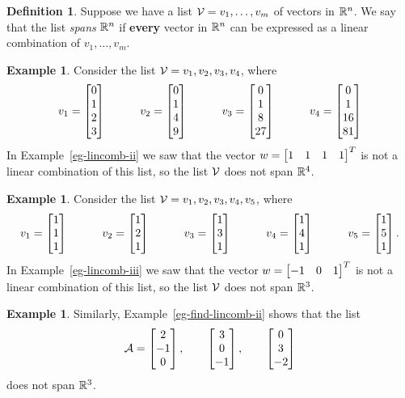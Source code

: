 \documentclass[reqno]{amsart}
\theoremstyle{definition}
\newtheorem{definition}[theorem]{Definition}
\newtheorem{example}[theorem]{Example}
\begin{document}
\begin{definition}\label{defn-spanning-list}
 Suppose we have a list $\mathcal{V}=v_1,\dotsc,v_m$ of vectors in ${\mathbb{R}}^n$.  We
 say that the list \emph{spans} ${\mathbb{R}}^n$ if \textbf{every} vector in
 ${\mathbb{R}}^n$ can be expressed as a linear combination of $v_1,\dotsc,v_m$.
\end{definition}
\begin{example}\label{eg-not-span-i}
 Consider the list $\mathcal{V}=v_1,v_2,v_3,v_4$, where
 \[ v_1 = \left[\begin{matrix} 0 \\ 1 \\  2 \\  3 \end{matrix}\right] \hspace{3em}
    v_2 = \left[\begin{matrix} 0 \\ 1 \\  4 \\  9 \end{matrix}\right] \hspace{3em}
    v_3 = \left[\begin{matrix} 0 \\ 1 \\  8 \\ 27 \end{matrix}\right] \hspace{3em}
    v_4 = \left[\begin{matrix} 0 \\ 1 \\ 16 \\ 81 \end{matrix}\right]
 \]
 In Example~\ref{eg-lincomb-ii} we saw that the vector
 $w=\left[\begin{matrix} 1 & 1 & 1 & 1\end{matrix}\right]^T$ is not a linear combination of this
 list, so the list $\mathcal{V}$ does not span ${\mathbb{R}}^4$.
\end{example}
\begin{example}\label{eg-not-span-ii}
 Consider the list $\mathcal{V}=v_1,v_2,v_3,v_4,v_5$, where
 \[ v_1 = \left[\begin{matrix} 1 \\ 1 \\ 1 \end{matrix}\right] \hspace{3em}
    v_2 = \left[\begin{matrix} 1 \\ 2 \\ 1 \end{matrix}\right] \hspace{3em}
    v_3 = \left[\begin{matrix} 1 \\ 3 \\ 1 \end{matrix}\right] \hspace{3em}
    v_4 = \left[\begin{matrix} 1 \\ 4 \\ 1 \end{matrix}\right] \hspace{3em}
    v_5 = \left[\begin{matrix} 1 \\ 5 \\ 1 \end{matrix}\right].
 \]
 In Example~\ref{eg-lincomb-iii} we saw that the vector
 $w=\left[\begin{matrix} -1 & 0 & 1 \end{matrix}\right]^T$ is not a linear combination of this
 list, so the list $\mathcal{V}$ does not span ${\mathbb{R}}^3$.
\end{example}
\begin{example}\label{eg-not-span-iii}
 Similarly, Example~\ref{eg-find-lincomb-ii} shows that the list
 \[ \mathcal{A} = \left[\begin{matrix} 2 \\ -1 \\  0 \end{matrix}\right], \qquad
          \left[\begin{matrix} 3 \\  0 \\ -1 \end{matrix}\right], \qquad
          \left[\begin{matrix} 0 \\  3 \\ -2 \end{matrix}\right]
 \]
 does not span ${\mathbb{R}}^3$.
\end{example}
\end{document}
